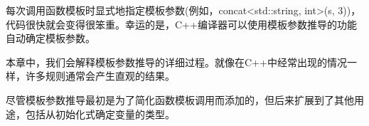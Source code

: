 每次调用函数模板时显式地指定模板参数(例如，concat<std::string, int>(s, 3))，代码很快就会变得很笨重。幸运的是，C++编译器可以使用模板参数推导的功能自动确定模板参数。

本章中，我们会解释模板参数推导的详细过程。就像在C++中经常出现的情况一样，许多规则通常会产生直观的结果。

尽管模板参数推导最初是为了简化函数模板调用而添加的，但后来扩展到了其他用途，包括从初始化式确定变量的类型。
